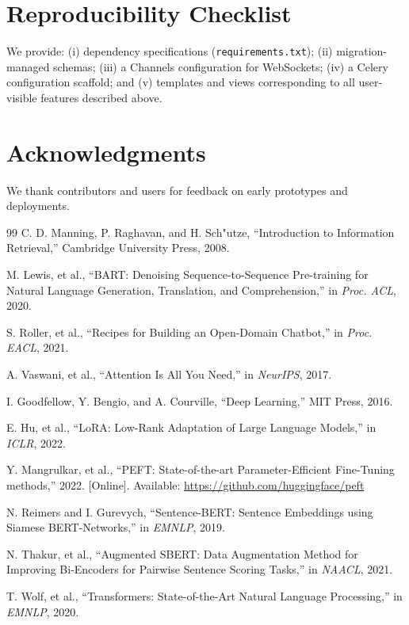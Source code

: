 \documentclass[conference]{IEEEtran}
\begin{document}
\section*{Reproducibility Checklist}
We provide: (i) dependency specifications (\texttt{requirements.txt}); (ii) migration-managed schemas; (iii) a Channels configuration for WebSockets; (iv) a Celery configuration scaffold; and (v) templates and views corresponding to all user-visible features described above.

\section*{Acknowledgments}
We thank contributors and users for feedback on early prototypes and deployments.

\begin{thebibliography}{99}
C. D. Manning, P. Raghavan, and H. Sch"utze, ``Introduction to Information Retrieval,'' Cambridge University Press, 2008.

M. Lewis, et al., ``BART: Denoising Sequence-to-Sequence Pre-training for Natural Language Generation, Translation, and Comprehension,'' in \emph{Proc. ACL}, 2020.

S. Roller, et al., ``Recipes for Building an Open-Domain Chatbot,'' in \emph{Proc. EACL}, 2021.
 
A. Vaswani, et al., ``Attention Is All You Need,'' in \emph{NeurIPS}, 2017.

I. Goodfellow, Y. Bengio, and A. Courville, ``Deep Learning,'' MIT Press, 2016.

E. Hu, et al., ``LoRA: Low-Rank Adaptation of Large Language Models,'' in \emph{ICLR}, 2022.

Y. Mangrulkar, et al., ``PEFT: State-of-the-art Parameter-Efficient Fine-Tuning methods,'' 2022. [Online]. Available: \url{https://github.com/huggingface/peft}

N. Reimers and I. Gurevych, ``Sentence-BERT: Sentence Embeddings using Siamese BERT-Networks,'' in \emph{EMNLP}, 2019.

N. Thakur, et al., ``Augmented SBERT: Data Augmentation Method for Improving Bi-Encoders for Pairwise Sentence Scoring Tasks,'' in \emph{NAACL}, 2021.

T. Wolf, et al., ``Transformers: State-of-the-Art Natural Language Processing,'' in \emph{EMNLP}, 2020.


\end{thebibliography}
\end{document}
